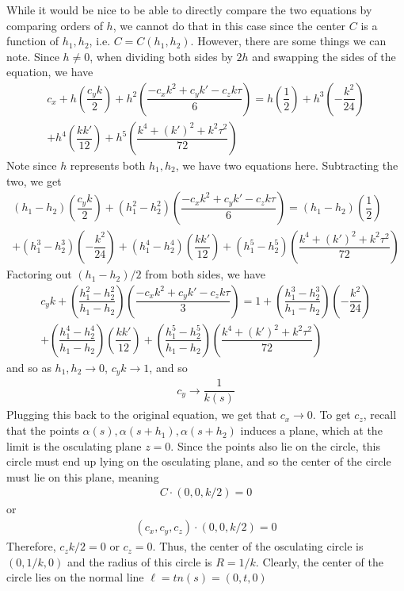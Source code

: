 \documentclass{article}
\begin{document}
	While it would be nice to be able to directly compare the two equations by comparing orders of $h$, we cannot do that in this case since the center $C$ is a function of $h_1, h_2$, i.e. $C = C(h_1, h_2)$. However, there are some things we can note. Since $h \neq 0$, when dividing both sides by $2h$ and swapping the sides of the equation, we have
	\begin{gather*}
		c_x + h \left( \dfrac{c_y k}{2} \right) + h^2 \left( \dfrac{-c_x k^2 + c_y k' - c_z k \tau}{6} \right) = h \left( \dfrac{1}{2} \right) + h^3 \left( - \dfrac{k^2}{24} \right) \\
		+ h^4 \left( \dfrac{k k'}{12} \right) + h^5 \left( \dfrac{k^4 + (k')^2 + k^2 \tau^2}{72} \right)
	\end{gather*}
	Note since $h$ represents both $h_1, h_2$, we have two equations here. Subtracting the two, we get
	\begin{gather*}
		(h_1 - h_2) \left( \dfrac{c_y k}{2} \right) + \left( h_1^2 - h_2^2 \right) \left( \dfrac{-c_x k^2 + c_y k' - c_z k \tau}{6} \right) = (h_1 - h_2) \left( \dfrac{1}{2} \right) \\
		+ \left( h_1^3 - h_2^3 \right) \left( - \dfrac{k^2}{24} \right) + \left( h_1^4 - h_2^4 \right) \left( \dfrac{k k'}{12} \right) + \left( h_1^5 - h_2^5 \right) \left( \dfrac{k^4 + (k')^2 + k^2 \tau^2}{72} \right)
	\end{gather*}
	Factoring out $(h_1 - h_2)/2$ from both sides, we have
	\begin{gather*}
		c_y k + \left( \dfrac{h_1^2 - h_2^2}{h_1 - h_2} \right) \left( \dfrac{-c_x k^2 + c_y k' - c_z k \tau}{3} \right) = 1 + \left( \dfrac{h_1^3 - h_2^3}{h_1 - h_2} \right) \left( - \dfrac{k^2}{24} \right) \\
		+ \left( \dfrac{h_1^4 - h_2^4}{h_1 - h_2} \right) \left( \dfrac{k k'}{12} \right) + \left( \dfrac{h_1^5 - h_2^5}{h_1 - h_2} \right) \left( \dfrac{k^4 + (k')^2 + k^2 \tau^2}{72} \right)
	\end{gather*}
	and so as $h_1, h_2 \to 0$, $c_y k \to 1$, and so
	\begin{gather*}
		c_y \to \dfrac{1}{k(s)}
	\end{gather*}
	Plugging this back to the original equation, we get that $c_x \to 0$. To get $c_z$, recall that the points $\alpha(s), \alpha(s + h_1), \alpha(s + h_2)$ induces a plane, which at the limit is the osculating plane $z = 0$. Since the points also lie on the circle, this circle must end up lying on the osculating plane, and so the center of the circle must lie on this plane, meaning
	\begin{gather*}
		C \cdot (0, 0, k/2) = 0
	\end{gather*}
	or
	\begin{gather*}
		\left(c_x, c_y, c_z\right) \cdot (0, 0, k/2) = 0
	\end{gather*}
	Therefore, $c_z k/2 = 0$ or $c_z = 0$. Thus, the center of the osculating circle is $(0, 1/k, 0)$ and the radius of this circle is $R = 1/k$. Clearly, the center of the circle lies on the normal line $\ell = tn(s) = (0, t, 0)$
	
\end{document}
